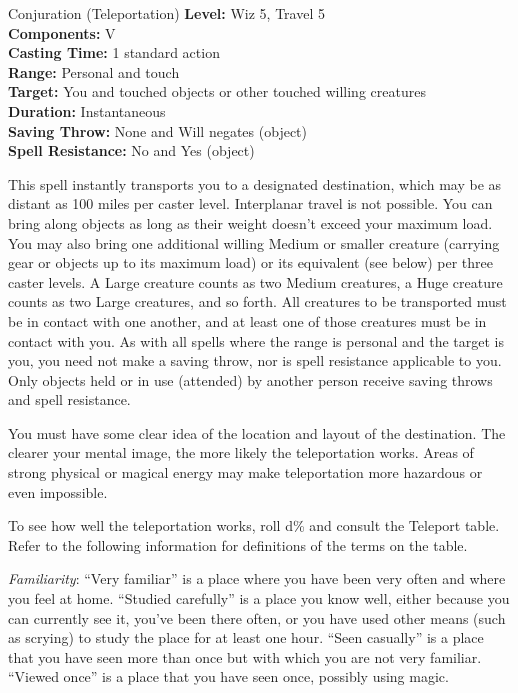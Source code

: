 {Conjuration (Teleportation)}
{
	\textbf{Level:}
	Wiz 5, Travel 5\\
	\textbf{Components:}
	V\\
	\textbf{Casting Time:}
	1 standard action\\
	\textbf{Range:}
	Personal and touch\\
	\textbf{Target:}
	You and touched objects or other touched willing creatures\\
	\textbf{Duration:}
	Instantaneous\\
	\textbf{Saving Throw:}
	None and Will negates (object)\\
	\textbf{Spell Resistance:}
	No and Yes (object)\\
}
{
	This spell instantly transports you to a designated destination, which may be as distant as 100 miles per caster level. Interplanar travel is not possible. You can bring along objects as long as their weight doesn't exceed your maximum load. You may also bring one additional willing Medium or smaller creature (carrying gear or objects up to its maximum load) or its equivalent (see below) per three caster levels. A Large creature counts as two Medium creatures, a Huge creature counts as two Large creatures, and so forth. All creatures to be transported must be in contact with one another, and at least one of those creatures must be in contact with you. As with all spells where the range is personal and the target is you, you need not make a saving throw, nor is spell resistance applicable to you. Only objects held or in use (attended) by another person receive saving throws and spell resistance.

	You must have some clear idea of the location and layout of the destination. The clearer your mental image, the more likely the teleportation works. Areas of strong physical or magical energy may make teleportation more hazardous or even impossible.

	To see how well the teleportation works, roll d\% and consult the Teleport table. Refer to the following information for definitions of the terms on the table.

	\textit{Familiarity}:
	``Very familiar'' is a place where you have been very often and where you feel at home. ``Studied carefully'' is a place you know well, either because you can currently see it, you've been there often, or you have used other means (such as scrying) to study the place for at least one hour. ``Seen casually'' is a place that you have seen more than once but with which you are not very familiar. ``Viewed once'' is a place that you have seen once, possibly using magic.

}
